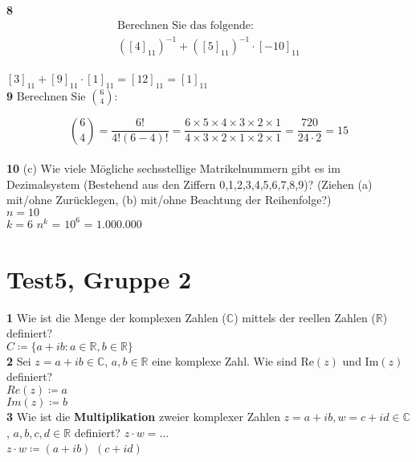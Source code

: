 \documentclass[11pt]{article}
\begin{document}
{{    \textbf{8} \[
                   \begin{gathered}
                       \text{Berechnen Sie das folgende:} \\
                       \left([4]_{11}\right)^{-1} + \left([5]_{11}\right)^{-1} \cdot [-10]_{11}
                   \end{gathered}
    \]\\
    $[3]_{11}+[9]_{11}\cdot[1]_{11} = [12]_{11} = [1]_{11}$\\

    \textbf{9} Berechnen Sie $\binom{6}{4}$:

    \[
        \binom{6}{4} = \frac{6!}{4!(6-4)!} = \frac{6 \times 5 \times 4 \times 3 \times 2 \times 1}{4 \times 3 \times 2 \times 1 \times 2 \times 1} = \frac{720}{24 \cdot 2} = 15
    \]\\


    \textbf{10} (c) Wie viele Mögliche sechsstellige Matrikelnummern gibt es im Dezimalsystem (Bestehend aus den Ziffern {0,1,2,3,4,5,6,7,8,9})? (Ziehen (a) mit/ohne Zurücklegen, (b) mit/ohne Beachtung der Reihenfolge?)\\
    $n = 10$\\
    $k = 6$
    $n^{k}$ = $10^{6}$ = $1.000.000$

\section{Test5, Gruppe 2}\label{sec:test5-gruppe-2}


    \textbf{1} Wie ist die Menge der komplexen Zahlen ($\mathbb{C}$) mittels der reellen Zahlen ($\mathbb{R}$) definiert?\\
    $C \coloneqq \{ a + ib : a \in \mathbb{R}, b \in \mathbb{R} \}$\\

    \textbf{2} Sei $ z = a + ib \in \mathbb{C} $, $ a,b \in \mathbb{R} $ eine komplexe Zahl. Wie sind $ \text{Re}(z) $ und $ \text{Im}(z) $ definiert?\\
    $Re(z) \coloneqq a$\\
    $Im(z) \coloneqq b$\\

    \textbf{3} Wie ist die \textbf{Multiplikation} zweier komplexer Zahlen $ z = a + ib, w = c + id \in \mathbb{C} $, $ a,b,c,d \in \mathbb{R} $ definiert? $ z \cdot w = \ldots $\\
    $z \cdot w \coloneqq (a + ib)$  \cdot  $(c + id)$\\

}}
\end{document}
